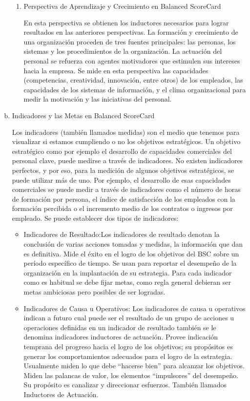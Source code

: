 \begin{enumerate}[a)]
\begin{enumerate}[1.]
		\item Perspectiva de Aprendizaje y Crecimiento en Balanced ScoreCard

		En esta perspectiva se obtienen los inductores necesarios para lograr resultados en las anteriores perspectivas. La formación y crecimiento de una organización proceden de tres fuentes principales: las personas, los sistemas y los procedimientos de la organización.
La actuación del personal se refuerza con agentes motivadores que estimulen sus intereses hacia la empresa. Se mide en esta perspectiva las capacidades (competencias, creatividad, innovación, entre otros) de los empleados, las capacidades de los sistemas de información, y el clima organizacional para medir la motivación y las iniciativas del personal.


		\end{enumerate}

	 \item Indicadores y las Metas en Balanced ScoreCard

	Los indicadores (también llamados medidas) son el medio que tenemos para visualizar si estamos cumpliendo o no los objetivos estratégicos.
Un objetivo estratégico como por ejemplo el desarrollo de capacidades comerciales del personal clave, puede medirse a través de indicadores. No existen indicadores perfectos, y por eso, para la medición de algunos objetivos estratégicos, se puede utilizar más de uno. Por ejemplo, el desarrollo de esas capacidades comerciales se puede medir a través de indicadores como el número de horas de formación por persona, el índice de satisfacción de los empleados con la formación percibida o el incremento medio de los contratos o ingresos por empleado. Se puede establecer dos tipos de indicadores:

		\begin{itemize}
  		  \item Indicadores de Resultado:Los indicadores de resultado denotan la conclusión de varias acciones tomadas y medidas, la información que dan es definitiva. Mide el éxito en el logro de los objetivos del BSC sobre un período específico de tiempo. Se usan para reportar el desempeño de la organización en la implantación de su estrategia. Para cada indicador como es habitual se debe fijar metas, como regla general debieran ser metas ambiciosas pero posibles de ser logradas.

  		  \item Indicadores de Causa u Operativos: Los indicadores de causa u operativos indican a futuro cual puede ser el resultado de un grupo de acciones u operaciones definidas en un indicador de resultado también se le denomina indicadores inductores de actuación. Provee indicación temprana del progreso hacia el logro de los objetivos; su propósitos es generar los comportamientos adecuados para el logro de la estrategia. Usualmente miden lo que debe “hacerse bien” para alcanzar los objetivos. Miden las palancas de valor, los elementos “impulsores” del desempeño. Su propósito es canalizar y direccionar esfuerzos. También llamados Inductores de Actuación.
  		 

\end{itemize}
\end{enumerate}
